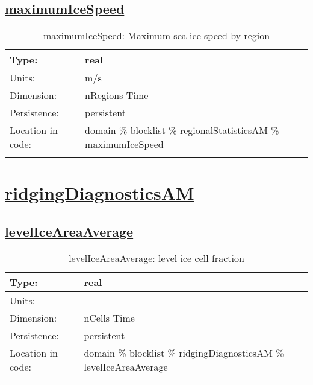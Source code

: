 \subsection[maximumIceSpeed]{\hyperref[sec:var_tab_regionalStatisticsAM]{maximumIceSpeed}}
\label{subsec:var_sec_regionalStatisticsAM_maximumIceSpeed}
\begin{center}
\begin{longtable}{| p{2.0in} | p{4.0in} |}
        \hline 
        Type: & real \\
        \hline 
        Units: & \si{m/s} \\
        \hline 
        Dimension: & nRegions Time \\
        \hline 
        Persistence: & persistent \\
        \hline 
         Location in code: & domain \% blocklist \% regionalStatisticsAM \% maximumIceSpeed \\
         \hline 
    \caption{maximumIceSpeed: Maximum sea-ice speed by region}
\end{longtable}
\end{center}
\section[ridgingDiagnosticsAM]{\hyperref[sec:var_tab_ridgingDiagnosticsAM]{ridgingDiagnosticsAM}}
\label{sec:var_sec_ridgingDiagnosticsAM}
\subsection[levelIceAreaAverage]{\hyperref[sec:var_tab_ridgingDiagnosticsAM]{levelIceAreaAverage}}
\label{subsec:var_sec_ridgingDiagnosticsAM_levelIceAreaAverage}
\begin{center}
\begin{longtable}{| p{2.0in} | p{4.0in} |}
        \hline 
        Type: & real \\
        \hline 
        Units: & \si{-} \\
        \hline 
        Dimension: & nCells Time \\
        \hline 
        Persistence: & persistent \\
        \hline 
         Location in code: & domain \% blocklist \% ridgingDiagnosticsAM \% levelIceAreaAverage \\
         \hline 
    \caption{levelIceAreaAverage: level ice cell fraction}
\end{longtable}
\end{center}
